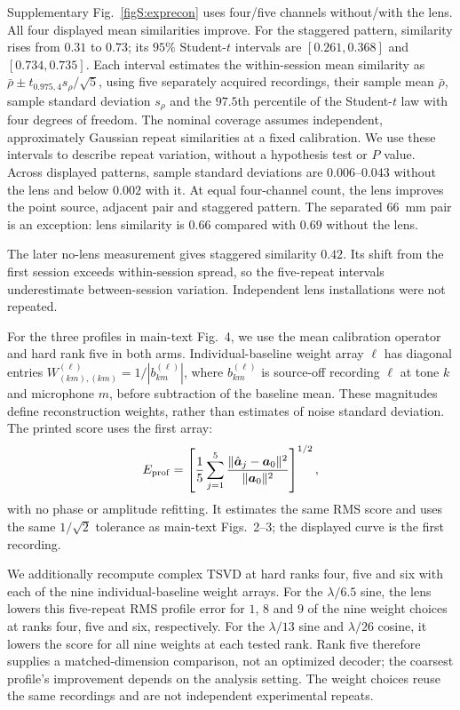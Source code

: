 \documentclass[pdflatex,sn-nature]{sn-jnl}%
\begin{document}
Supplementary Fig.~\ref{figS:exprecon} uses four/five channels without/with
the lens. All four displayed mean similarities improve. For the staggered
pattern, similarity rises from $0.31$ to $0.73$; its $95\%$ Student-$t$
intervals are $[0.261,0.368]$ and $[0.734,0.735]$.
Each interval estimates the within-session mean similarity as
$\bar\rho\pm t_{0.975,4}s_\rho/\sqrt5$, using five separately acquired
recordings, their sample mean $\bar\rho$, sample standard deviation $s_\rho$ and the $97.5$th percentile
of the Student-$t$ law with four degrees of freedom. The nominal coverage assumes independent, approximately Gaussian repeat similarities at a fixed calibration. We use these intervals to describe repeat variation, without a hypothesis test or $P$ value.
Across displayed patterns, sample standard deviations are $0.006$--$0.043$
without the lens and below $0.002$ with it.
At equal four-channel count, the lens improves the point source, adjacent
pair and staggered pattern. The separated $66$~mm pair is an exception:
lens similarity is $0.66$ compared with $0.69$ without the lens.

The later no-lens measurement gives staggered similarity $0.42$.
Its shift from the first session exceeds within-session spread, so the
five-repeat intervals underestimate between-session variation.
Independent lens installations were not repeated.

For the three profiles in main-text Fig.~4, we use the mean calibration operator and hard rank five in both arms. Individual-baseline weight array $\ell$ has diagonal entries $W^{(\ell)}_{(km),(km)}=1/|b^{(\ell)}_{km}|$, where $b^{(\ell)}_{km}$ is source-off recording $\ell$ at tone $k$ and microphone $m$, before subtraction of the baseline mean. These magnitudes define reconstruction weights, rather than estimates of noise standard deviation. The printed score uses the first array:
\[
 E_{\rm prof}=\left[\frac15\sum_{j=1}^{5}
 \frac{\|\hat{\bm a}_j-\bm a_0\|^2}{\|\bm a_0\|^2}\right]^{1/2},
\]
with no phase or amplitude refitting. It estimates the same RMS score and uses the same $1/\sqrt2$ tolerance as main-text Figs.~2--3; the displayed curve is the first recording.

We additionally recompute complex TSVD at hard ranks four, five and six with each of the nine individual-baseline weight arrays. For the $\lambda/6.5$ sine, the lens lowers this five-repeat RMS profile error for $1$, $8$ and $9$ of the nine weight choices at ranks four, five and six, respectively. For the $\lambda/13$ sine and $\lambda/26$ cosine, it lowers the score for all nine weights at each tested rank. Rank five therefore supplies a matched-dimension comparison, not an optimized decoder; the coarsest profile's improvement depends on the analysis setting. The weight choices reuse the same recordings and are not independent experimental repeats.
\end{document}
